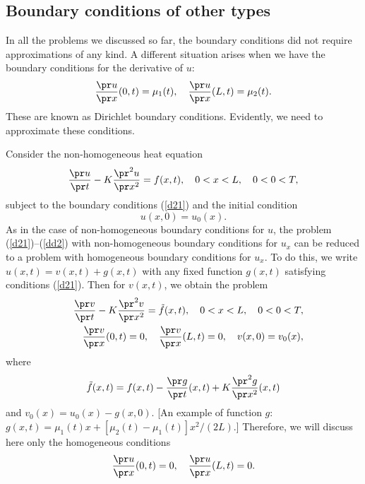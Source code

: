 
\subsection{Boundary conditions of other types}

 
In all the problems we discussed so far, the
boundary conditions did not require approximations of any kind.
A different situation arises when we have the boundary conditions for the derivative
of $u$:
\begin{equation}
\frac{\pr u}{\pr x}(0,t)=\mu_{1}(t), \quad
\frac{\pr u}{\pr x}(L,t)=\mu_{2}(t). \label{d21}
\end{equation}
These are known as Dirichlet boundary conditions.
Evidently, we need to approximate these conditions.
 
Consider the non-homogeneous heat equation
\begin{equation}
\frac{\pr u}{\pr t} - K\frac{\pr^{2} u}{\pr x^{2}}=f(x,t), \quad
0<x< L, \quad 0<0<T,   \label{dd1}
\end{equation}
subject to the boundary conditions (\ref{d21}) and the initial condition
\begin{equation}
u(x, 0) = u_{0}(x).   \label{dd2}
\end{equation}
As in the case of non-homogeneous boundary conditions for $u$, the problem
(\ref{d21})--(\ref{dd2}) with non-homogeneous boundary conditions for $u_{x}$
can be reduced to
a problem with homogeneous boundary conditions for $u_{x}$. To do this, we write
$u(x,t)=v(x,t)+g(x,t)$ with any fixed function $g(x,t)$ satisfying conditions
(\ref{d21}). Then for $v(x,t)$, we obtain the problem
\begin{eqnarray}
&&\frac{\pr v}{\pr t} - K\frac{\pr^{2} v}{\pr x^{2}}=\tilde{f}(x,t), \quad
0<x< L, \quad 0<0<T,   \nonumber \\
&&\frac{\pr v}{\pr x}(0,t)=0, \quad
\frac{\pr v}{\pr x}(L,t)=0, \quad
v(x, 0) = v_{0}(x), \nonumber
\end{eqnarray}
where 
$$\tilde{f}(x,t)=f(x,t)-\frac{\pr g}{\pr t}(x,t)+K\frac{\pr^2 g}{\pr x^2}(x,t)$$ 
and $v_{0}(x)=u_{0}(x)-g(x,0)$.
[An example of function $g$: $g(x,t)=\mu_{1}(t)x+[\mu_{2}(t)-\mu_{1}(t)]x^2/(2L)$.]
Therefore, we will discuss here only the homogeneous conditions
\begin{equation}
\frac{\pr u}{\pr x}(0,t)=0, \quad
\frac{\pr u}{\pr x}(L,t)=0. \label{d22}
\end{equation}

